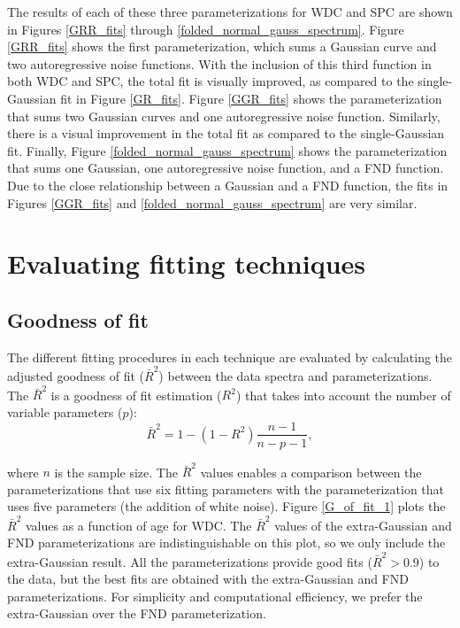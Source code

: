 \documentclass[draft, jgrga]{AGUTeX}
\begin{document}
\begin{article}
The results of each of these three parameterizations for WDC and SPC are shown in Figures \ref{GRR_fits} through \ref{folded_normal_gauss_spectrum}. Figure \ref{GRR_fits} shows the first parameterization, which sums a Gaussian curve and two autoregressive noise functions. With the inclusion of this third function in both WDC and SPC, the total fit is visually improved, as compared to the single-Gaussian fit in Figure \ref{GR_fits}. Figure \ref{GGR_fits} shows the parameterization that sums two Gaussian curves and one autoregressive noise function. Similarly, there is a visual improvement in the total fit as compared to the single-Gaussian fit. Finally, Figure \ref{folded_normal_gauss_spectrum} shows the parameterization that sums one Gaussian, one autoregressive noise function, and a FND function. Due to the close relationship between a Gaussian and a FND function, the fits in Figures \ref{GGR_fits} and \ref{folded_normal_gauss_spectrum} are very similar.


\section{Evaluating fitting techniques}
\subsection{Goodness of fit}
The different fitting procedures in each technique are evaluated by calculating the adjusted goodness of fit ($\bar{R}^2$) between the data spectra and parameterizations. The $\bar{R}^2$ is a goodness of fit estimation ($R^2$) that takes into account the number of variable parameters ($p$):
\begin{equation}
\bar{R}^2 = 1 - (1 -R^2) \frac{n - 1}{n - p - 1},
\end{equation}

\noindent where $n$ is the sample size.
The $\bar{R}^2$ values enables a comparison between the parameterizations that use six fitting parameters with the parameterization that uses five parameters (the addition of white noise). Figure \ref{G_of_fit_1} plots the $\bar{R}^2$ values as a function of age for WDC. The $\bar{R}^2$ values of the extra-Gaussian and FND parameterizations are indistinguishable on this plot, so we only include the extra-Gaussian result. All the parameterizations provide good fits ($\bar{R}^2 > 0.9$) to the data, but the best fits are obtained with the extra-Gaussian and FND parameterizations. For simplicity and computational efficiency, we prefer the extra-Gaussian over the FND parameterization.


\end{article}
\end{document}

